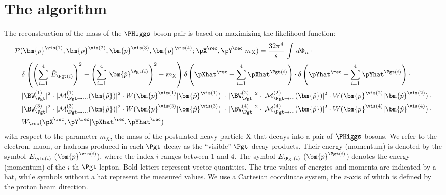 \section{The algorithm}
\label{sec:algorithm}

The reconstruction of the mass of the $\PHiggs$ boson pair is based on maximizing the likelihood function:
\begin{align}
& \mathcal{P}(\bm{p}^{\vis(1)},\bm{p}^{\vis(2)},\bm{p}^{\vis(3)},\bm{p}^{\vis(4)};\pX^{\rec},\pY^{\rec}|m_{\textrm{X}})
= \frac{32\pi^{4}}{s} \, \int \, d\Phi_{n} \, \cdot \nonumber \\
& \quad \delta\left( \left(\sum_{i=1}^{4} \, \hat{E}_{\Pgt(i)}\right)^{2} - \left(\sum_{i=1}^{4} \, \bm{\hat{p}}^{\Pgt(i)}\right)^{2} - m_{\textrm{X}} \right) 
  \delta\left( \pXhat^{\rec} + \sum_{i=1}^{4} \pXhat^{\Pgt(i)} \right) \cdot \delta\left( \pYhat^{\rec} + \sum_{i=1}^{4} \pYhat^{\Pgt(i)} \right) \cdot \nonumber \\
& \quad \vert \BW^{(1)}_{\Pgt} \vert^{2} \cdot \vert \mathcal{M}^{(1)}_{\Pgt\to\cdots}(\bm{\hat{p}}) \vert^{2} \cdot W(\bm{p}^{\vis(1)}|\bm{\hat{p}}^{\vis(1)}) \, \cdot 
\, \vert \BW^{(2)}_{\Pgt} \vert^{2} \cdot \vert \mathcal{M}^{(2)}_{\Pgt\to\cdots}(\bm{\hat{p}}) \vert^{2} \cdot W(\bm{p}^{\vis(2)}|\bm{\hat{p}}^{\vis(2)}) \, \cdot \nonumber \\
& \quad \vert \BW^{(3)}_{\Pgt} \vert^{2} \cdot \vert \mathcal{M}^{(3)}_{\Pgt\to\cdots}(\bm{\hat{p}}) \vert^{2} \cdot W(\bm{p}^{\vis(3)}|\bm{\hat{p}}^{\vis(3)}) \, \cdot
\, \vert \BW^{(4)}_{\Pgt} \vert^{2} \cdot \vert \mathcal{M}^{(4)}_{\Pgt\to\cdots}(\bm{\hat{p}}) \vert^{2} \cdot W(\bm{p}^{\vis(4)}|\bm{\hat{p}}^{\vis(4)}) \, \cdot \nonumber \\
& \quad W_{\rec}( \pX^{\rec},\pY^{\rec} | \pXhat^{\rec},\pYhat^{\rec} ) 
\label{eq:likelihood}
\end{align}
with respect to the parameter $m_{\textrm{X}}$, 
the mass of the postulated heavy particle $\textrm{X}$ that decays into a pair of $\PHiggs$ bosons.
We refer to the electron, muon, or hadrons produced in each $\Pgt$ decay as the ``visible'' $\Pgt$ decay products.
Their energy (momentum) is denoted by the symbol $E_{\vis(i)}$ ($\bm{p}^{\vis(i)}$), where the index $i$ ranges between $1$ and $4$.
The symbol $E_{\Pgt(i)}$ ($\bm{p}^{\Pgt(i)}$) denotes the energy (momentum) of the $i$-th $\Pgt$ lepton.
Bold letters represent vector quantities.
The true values of energies and momenta are indicated by a hat,
while symbols without a hat represent the measured values.
We use a Cartesian coordinate system, the $z$-axis of which is defined by the proton beam direction.
